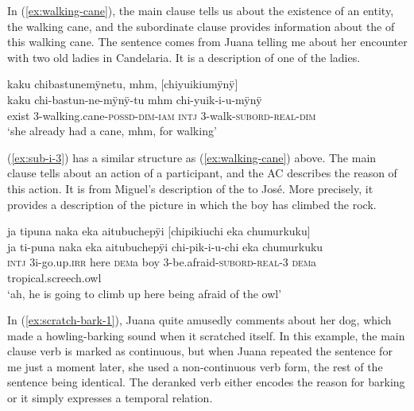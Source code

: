 
In (\ref{ex:walking-cane}), the main clause tells us about the existence of an entity, the walking cane, and the subordinate clause provides information about the  of this walking cane. The sentence comes from Juana telling me about her encounter with two old ladies in Candelaria. It is a description of one of the ladies.

\ea\label{ex:walking-cane}
\begingl
\glpreamble  kaku chibastunemÿnetu, mhm, \textup{[}chiyuikiumÿnÿ\textup{]}\\
\gla  kaku chi-bastun-ne-mÿnÿ-tu mhm chi-yuik-i-u-mÿnÿ\\
\glb exist 3-walking.cane-\textsc{possd}-\textsc{dim}-\textsc{iam} \textsc{intj} 3-walk-\textsc{subord}-\textsc{real}-\textsc{dim}\\
\glft ‘she already had a cane, mhm, for walking’
\endgl
\trailingcitation{[jxx-p120515l-1.220-221]}
\xe

(\ref{ex:sub-i-3}) has a similar structure as (\ref{ex:walking-cane}) above. The main clause tells about an action of a participant, and the AC describes the reason of this action. It is from Miguel’s description of the  to José. More precisely, it provides a description of the picture in which the boy has climbed the rock. 


\ea\label{ex:sub-i-3}
\begingl 
\glpreamble ja tipuna naka eka aitubuchepÿi \textup{[}chipikiuchi eka chumurkuku\textup{]}\\
\gla ja ti-puna naka eka aitubuchepÿi chi-pik-i-u-chi eka chumurkuku\\ 
\glb \textsc{intj} 3i-go.up.\textsc{irr} here \textsc{dem}a boy 3-be.afraid-\textsc{subord}-\textsc{real}-3 \textsc{dem}a tropical.screech.owl\\ 
\glft ‘ah, he is going to climb up here being afraid of the owl’\\ 
\endgl
\trailingcitation{[mox-a110920l-2.120-122]}
\xe

In (\ref{ex:scratch-bark-1}), Juana quite amusedly comments about her dog, which made a howling-barking sound when it scratched itself. In this example, the main clause verb is marked as continuous, but when Juana repeated the sentence for me just a moment later, she used a non-continuous verb form, the rest of the sentence being identical. %
The deranked verb either encodes the reason for barking or it simply expresses a temporal relation.

